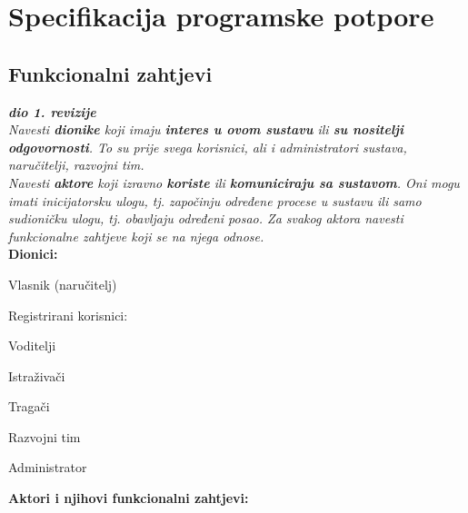 \chapter{Specifikacija programske potpore}
		
	\section{Funkcionalni zahtjevi}
			
			\textbf{\textit{dio 1. revizije}}\\
			
			\textit{Navesti \textbf{dionike} koji imaju \textbf{interes u ovom sustavu} ili  \textbf{su nositelji odgovornosti}. To su prije svega korisnici, ali i administratori sustava, naručitelji, razvojni tim.}\\
				
			\textit{Navesti \textbf{aktore} koji izravno \textbf{koriste} ili \textbf{komuniciraju sa sustavom}. Oni mogu imati inicijatorsku ulogu, tj. započinju određene procese u sustavu ili samo sudioničku ulogu, tj. obavljaju određeni posao. Za svakog aktora navesti funkcionalne zahtjeve koji se na njega odnose.}\\
			
			
			\noindent \textbf{Dionici:}
			
			\begin{packed_enum}
				
				\item Vlasnik (naručitelj)
				\item Registrirani korisnici:
							
					\begin{packed_enum}
						\item Voditelji
						\item Istraživači
						\item Tragači
					\end{packed_enum}
					
				\item Razvojni tim
				\item Administrator
				
				
			\end{packed_enum}
			
			\noindent \textbf{Aktori i njihovi funkcionalni zahtjevi:}
			
